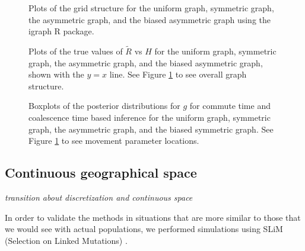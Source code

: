 \documentclass{article}
\newcommand{\comdist}{\widetilde R}
\newcommand{\plr}[1]{{\em \color{blue} #1}}
\begin{document}

\begin{figure}
\centering
\caption{Plots of the grid structure 
for the uniform graph, symmetric graph, the asymmetric graph,
and the biased asymmetric graph 
using the igraph R package.}
\label{fig:4x4_grids}
\end{figure}

\begin{figure}
\centering
\caption{Plots of the true values of $\comdist$ vs $H$ 
for the uniform graph, symmetric graph, the asymmetric graph,
and the biased asymmetric graph, 
shown with the $y=x$ line.
See Figure \ref{fig:4x4_grids} to see overall graph structure.}
\label{fig:4x4coalvcomH}
\end{figure}

\begin{figure}
\centering
\caption{Boxplots of the posterior distributions for $g$ for commute time and coalescence time
based inference for the uniform graph, symmetric graph, 
the asymmetric graph, and the biased symmetric graph.
See Figure \ref{fig:4x4_grids} to see movement parameter locations.}
\label{fig:4x4box}
\end{figure}


\subsection*{Continuous geographical space}

\plr{transition about discretization and continuous space}

In order to validate the methods in situations 
that are more similar to those that we would see with actual populations,
we performed simulations using SLiM (Selection on Linked Mutations) \citep{haller2016slim}.
\end{document}
